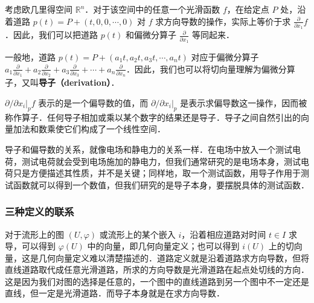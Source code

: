 考虑欧几里得空间 $\mathbb{R}^n$．对于该空间中的任意一个光滑函数 $f$，在给定点 $P$ 处，沿着道路 $p(t)=P+(t, 0, 0, \cdots, 0)$ 对 $f$ 求方向导数的操作，实际上等价于求 $\frac{\partial}{\partial x_1}f$．因此，我们可以把道路 $p(t)$ 和偏微分算子 $\frac{\partial}{\partial x_1}$ 等同起来．

一般地，道路 $p(t)=P+(a_1t, a_2t, a_3t, \cdots, a_nt)$ 对应于偏微分算子 $a_1\frac{\partial}{\partial x_1}+a_2\frac{\partial}{\partial x_2}+a_3\frac{\partial}{\partial x_3}+\cdots+a_n\frac{\partial}{\partial x_n}$．因此，我们也可以将切向量理解为偏微分算子，又叫\textbf{导子（derivation）}．





$\partial/\partial x_i|_{p}f$ 表示的是一个偏导数的值，而 $\partial/\partial x_i|_{p}$ 是表示求偏导数这一操作，因而被称作算子．任何导子相加或乘以某个数字的结果还是导子．导子之间自然引出的向量加法和数乘使它们构成了一个线性空间．

导子和偏导数的关系，就像电场和静电力的关系一样．在电场中放入一个测试电荷，测试电荷就会受到电场施加的静电力，但我们通常研究的是电场本身，测试电荷只是方便描述其性质，并不是关键；同样地，取一个测试函数，用导子作用于测试函数就可以得到一个数值，但我们研究的是导子本身，要摆脱具体的测试函数．


\subsubsection{三种定义的联系}

对于流形上的图 $(U,\varphi)$ 或流形上的某个嵌入 $i$，沿着相应道路对时间 $t\in I$ 求导，可以得到 $\varphi(U)$ 中的向量，即几何向量定义；也可以得到 $i(U)$ 上的切向量，这是几何向量定义难以清楚描述的．道路定义就是沿着道路求方向导数，但将直线道路取代成任意光滑道路，所求的方向导数是光滑道路在起点处切线的方向．这是因为我们对图的选择是任意的，一个图中的直线道路到另一个图中不一定还是直线，但一定是光滑道路．而导子本身就是在求方向导数．


